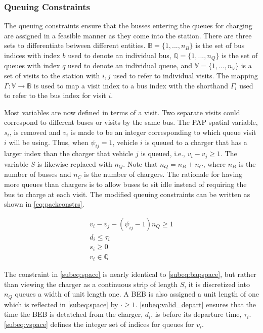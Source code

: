 \documentclass[ee,msthesis]{usuthesis}
\begin{document}
\subsubsection{Queuing Constraints}
\label{sec:queuing}
\noindent
The queuing constraints ensure that the busses entering the queues for charging are assigned in a feasible manner as
they come into the station. There are three sets to differentiate between different entities. \(\mathbb{B} = \{1, ...,
n_B\}\) is the set of bus indices with index \(b\) used to denote an individual bus, \(\mathbb{Q} = \{1, ..., n_Q\}\) is the set of
queues with index \(q\) used to denote an individual queue, and \(\mathbb{V} = \{1, ..., n_V\}\) is a set of visits to the
station with \(i,j\) used to refer to individual visits. The mapping \(\Gamma: \mathbb{V} \rightarrow \mathbb{B}\) is used to map a visit
index to a bus index with the shorthand \(\Gamma_i\) used to refer to the bus index for visit \(i\).

Most variables are now defined in terms of a visit. Two separate visits could correspond to different buses or visits by
the same bus. The PAP spatial variable, \(s_i\), is removed and \(v_i\) is made to be an integer corresponding to which
queue visit \(i\) will be using. Thus, when \(\psi_{ij} = 1\), vehicle \(i\) is queued to a charger that has a larger index than
the charger that vehicle \(j\) is queued, i.e., \(v_i-v_j \geq 1\). The variable \(S\) is likewise replaced with \(n_Q\). Note that
\(n_Q = n_B + n_C\), where \(n_B\) is the number of busses and \(n_C\) is the number of chargers. The rationale for having
more queues than chargers is to allow buses to sit idle instead of requiring the bus to charge at each visit. The
modified queuing constraints can be written as shown in \autoref{eq:packconstrs}.

\begin{subequations}
\label{eq:packconstrs}
\begin{align}
    v_i - v_j - (\psi_{ij} - 1)n_Q \geq 1       \label{subeq:space}        \\
    d_i \leq \tau_i                             \label{subeq:valid_depart} \\
    s_i \geq 0                               \label{subeq:pos_charge} \\
    v_i \in \mathbb{Q}                       \label{subeq:vspace}
\end{align}
\end{subequations}

The constraint in \autoref{subeq:space} is nearly identical to \autoref{subeq:bapspace}, but rather than viewing the
charger as a continuous strip of length \(S\), it is discretized into \(n_Q\) queues a width of unit length one. A BEB is
also assigned a unit length of one which is reflected in \autoref{subeq:space} by \(\cdot \geq 1\). \autoref{subeq:valid_depart}
ensures that the time the BEB is detatched from the charger, \(d_i\), is before its departure time, \(\tau_i\).
\autoref{subeq:vspace} defines the integer set of indices for queues for \(v_i\).
\end{document}
